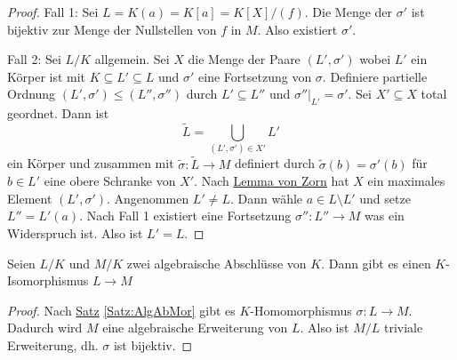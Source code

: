 \begin{proof}
    Fall 1: Sei $L=K(a)=K[a]=K[X]/(f)$. Die Menge der $\sigma'$ ist bijektiv zur Menge der Nullstellen von $f$ in $M$. Also existiert $\sigma'$.
    
    Fall 2: Sei $L/K$ allgemein. Sei $X$ die Menge der Paare $(L',\sigma')$ wobei $L'$ ein Körper ist mit $K\subseteq L'\subseteq L$ und $\sigma'$ eine Fortsetzung von $\sigma$.
    Definiere partielle Ordnung $(L',\sigma')\leq (L'',\sigma'')$ durch $L'\subseteq L''$ und $\sigma''|_{L'}=\sigma'$.
    Sei $X'\subseteq X$ total geordnet. Dann ist $$\tilde L=\bigcup\limits_{(L',\sigma')\in X'}L'$$ ein Körper und zusammen mit $\tilde\sigma\colon\tilde L\to M$ definiert durch $\tilde\sigma(b)=\sigma'(b)$ für $b\in L'$ eine obere Schranke von $X'$.
    Nach \hyperref[Satz:Zorn]{Lemma von Zorn} hat $X$ ein maximales Element $(L',\sigma')$.
    Angenommen $L'\neq L$. Dann wähle $a\in L\setminus L'$ und setze $L''=L'(a)$. Nach Fall 1 existiert eine Fortsetzung $\sigma''\colon L''\to M$ was ein Widerspruch ist. Also ist $L'=L$. 
\end{proof}
\begin{Kor}
    Seien $L/K$ und $M/K$ zwei algebraische Abschlüsse von $K$. Dann gibt es einen $K$-Isomorphismus $L\to M$
\end{Kor}
\begin{proof}
    Nach \hyperref[Satz:AlgAbMor]{Satz} \ref{Satz:AlgAbMor} gibt es $K$-Homomorphismus $\sigma\colon L\to M$. Dadurch wird $M$ eine algebraische Erweiterung von $L$. Also ist $M/L$ triviale Erweiterung, dh. $\sigma$ ist bijektiv.
\end{proof}
